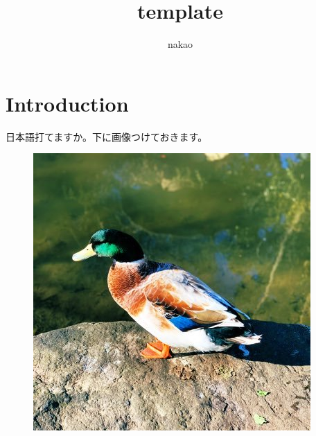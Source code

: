 \documentclass[a4paper]{jsarticle}
\begin{document}
\title{template}
\author{nakao}
\maketitle

\section{Introduction}

日本語打てますか。下に画像つけておきます。
\begin{figure}[h]
  \includegraphics[width=0.8\hsize]{kxMWriYJ_400x400.jpeg}
\end{figure}
\end{document}
